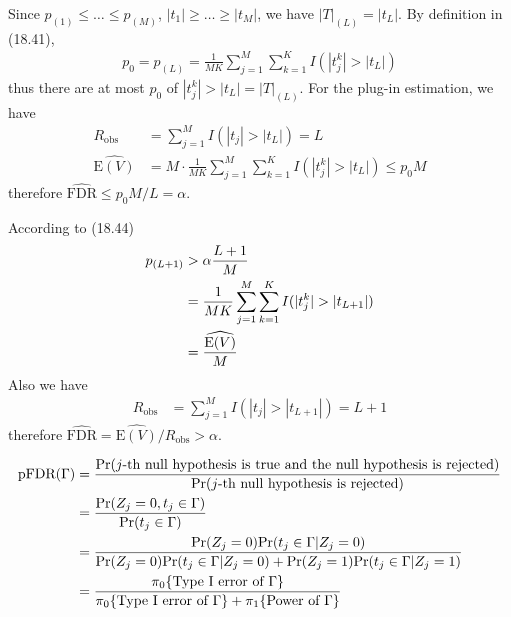 \begin{exercise}
  \begin{exerciseSection}
    Since $p_{(1)} \leq \ldots \leq p_{(M)}$, $|t_1|\geq\ldots\geq|t_M|$, we
    have $|T|_{(L)} = |t_L|$. By definition in (18.41),
    \begin{align}
      p_0 = p_{(L)} = \frac{1}{MK}\sum_{j=1}^M \sum_{k=1}^K I(|t_{j}^k| >
      |t_L|)
    \end{align}
    thus there are at most $p_0$ of $|t_{j}^k| > |t_L| = |T|_{(L)}$. For the
    plug-in estimation, we have
    \begin{align}
      R_{\mbox{obs}} & = \sum_{j=1}^M I(|t_j| > |t_L|) = L \\
      \widehat{\mbox{E}(V)} & = M\cdot \frac{1}{MK}\sum_{j=1}^M \sum_{k=1}^K
      I(|t_{j}^k| > |t_L|) \leq p_0M
    \end{align}
    therefore $\widehat{\mbox{FDR}}\leq p_0M/L = \alpha$.
  \end{exerciseSection}
  
  \begin{exerciseSection}
    According to (18.44)
    \begin{align}
      p_{(L+1)} & > \alpha \frac{L+1}{M} \notag \\
      & = \frac{1}{MK}\sum_{j=1}^M \sum_{k=1}^K I(|t_{j}^k| > |t_{L+1}|) \notag
      \\
      &= \frac{\widehat{\mbox{E}(V)}}{M}
    \end{align}
    Also we have
    \begin{align}
      R_{\mbox{obs}} & = \sum_{j=1}^M I(|t_j| > |t_{L+1}|) = L + 1
    \end{align}
    therefore $\widehat{\mbox{FDR}} =  \widehat{\mbox{E}(V)} / R_{\mbox{obs}} >
    \alpha$.
  \end{exerciseSection}
\end{exercise}

\begin{exercise}
  \begin{align}
    \mbox{pFDR}(\Gamma) &= \frac{\mbox{Pr}(\mbox{$j$-th null hypothesis
    is true and the null hypothesis is rejected})} {\mbox{Pr}(\mbox{$j$-th null
    hypothesis is rejected})} \notag \\
    & = \frac{\mbox{Pr}(Z_j=0,t_j\in\Gamma)}{\mbox{Pr}(t_j\in\Gamma)} \notag\\
    & = \frac{\mbox{Pr}(Z_j=0)\mbox{Pr}(t_j\in\Gamma|Z_j=0)}
    {\mbox{Pr}(Z_j=0)\mbox{Pr}(t_j\in\Gamma|Z_j=0) +
    \mbox{Pr}(Z_j=1)\mbox{Pr}(t_j\in\Gamma|Z_j=1)} \notag \\
    & = \frac{\pi_0 \{\mbox{Type I error of $\Gamma$}\}} {\pi_0 \{\mbox{Type I
    error of $\Gamma$}\} + \pi_1 \{\mbox{Power of $\Gamma$}\}}
  \end{align}
\end{exercise}


